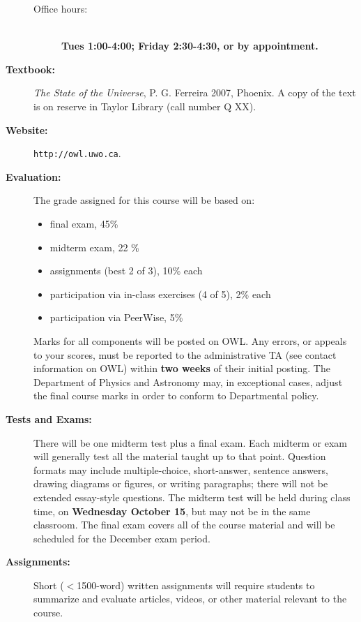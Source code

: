 \documentclass[12pt]{article}
\begin{document}
\begin{description}
\begin{description}
   \item[Office hours:]    \hspace{6cm}\\
   {\bf    Tues 1:00-4:00; Friday 2:30-4:30, or by appointment.} %

   \end{description}

\item[\bf Textbook:]  {\it The State of the Universe}, P. G. Ferreira 2007, Phoenix.
A copy of the text is on reserve in Taylor Library (call number Q XX). %

\item[\bf Website:] \verb$http://owl.uwo.ca$. %
\newpage


\item[\bf Evaluation:] The grade assigned for this course will be based on: 
\begin{itemize}
\item final exam, 45\%
\item midterm exam, 22 \% 
\item assignments (best 2 of 3), 10\% each
\item participation via in-class exercises (4 of 5), 2\% each
\item participation via PeerWise, 5\%
\end{itemize}
Marks for all components will be posted on OWL. Any errors, or appeals to your scores, must be reported to 
the administrative TA (see contact information on OWL) within {\bf two weeks} of their initial posting.
The Department of Physics and Astronomy may, in exceptional cases, adjust the final course marks in order to conform to Departmental policy.

\item[\bf Tests and Exams:] There will be one midterm test plus a final exam. Each midterm or exam will generally test all the material taught up to that point. 
Question formats may include multiple-choice, short-answer, sentence answers, drawing diagrams or figures, or writing paragraphs;
there will not be extended essay-style questions. 
The midterm test will be held during class time, on {\bf  Wednesday October 15}, but may not be in the same classroom.
The final exam covers all of the course material and will be scheduled for the December exam period.

\item[\bf Assignments:] Short ($<$1500-word) written assignments will require students to summarize and evaluate articles, videos, or
other material relevant to the course. 


\end{description}
\end{document}
